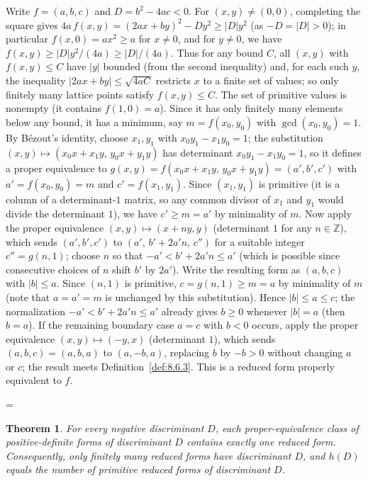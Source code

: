 \documentclass[11pt]{article}
\makeatletter
\theoremstyle{ntstyle}
\newtheorem{theorem}{Theorem}[subsection]
\let\nt@closedisplay\]
\def\nt@guardedclose{\@ifnextchar\par{\nt@closeafterpar}{\@ifnextchar\end{\postdisplaypenalty\@M\nt@closedisplay}{\nt@closedisplay}}}
\def\nt@closeafterpar\par{\@ifnextchar\par{\nt@closeafterpar}{\@ifnextchar\end{\postdisplaypenalty\@M\nt@closedisplay\par}{\nt@closedisplay\par}}}
\renewenvironment{proof}[1][\proofname]{\par
  \pushQED{\qed}\normalfont\topsep\medskipamount\edef\nt@afterproof{\@endparpenalty=\the\@endparpenalty\relax}\@beginparpenalty\@M\@endparpenalty\@M\let\]\nt@guardedclose\trivlist\item[]\textit{#1\@addpunct{.}} \ignorespaces}{\ifvmode\addpenalty\@M\fi\popQED\nt@afterproof\endtrivlist\@endpefalse}
\makeatother
\begin{document}
\begin{proof} Write $f=(a,b,c)$ and $D=b^2-4ac<0$. For
	$(x,y)\neq(0,0)$, completing the square gives
	$4a\,f(x,y)=(2ax+by)^2-Dy^2\ge|D|y^2$ (as $-D=|D|>0$); in particular
	$f(x,0)=ax^2\ge a$ for $x\neq0$, and for $y\neq0$,
	we have $f(x,y)\ge|D|y^2/(4a)\ge|D|/(4a)$. Thus for any bound $C$, all
	$(x,y)$ with $f(x,y)\le C$ have $|y|$ bounded (from the second
	inequality) and, for each such $y$, the inequality $|2ax+by|\le\sqrt{4aC}$ restricts
	$x$ to a finite set of values; so only finitely many lattice points
	satisfy $f(x,y)\le C$. The set of primitive values is nonempty (it contains $f(1,0)=a$). Since it has only finitely many elements below any bound, it has a minimum, say $m=f(x_0,y_0)$ with
	$\gcd(x_0, y_0)=1$. By B{\'e}zout's identity, choose $x_1,y_1$ with $x_0y_1-x_1y_0=1$;
	the substitution $(x,y)\mapsto(x_0x+x_1y,\,y_0x+y_1y)$ has
	determinant $x_0y_1-x_1y_0=1$, so it defines a proper equivalence to
	$g(x,y)=f(x_0x+x_1y,\,y_0x+y_1y)=(a',b',c')$ with $a'=f(x_0,y_0)=m$
	and $c'=f(x_1,y_1)$. Since $(x_1,y_1)$ is primitive (it is a column of a
	determinant-$1$ matrix, so any common divisor of $x_1$ and $y_1$ would
	divide the determinant $1$), we have $c'\ge m=a'$ by minimality of $m$. Now apply the
	proper equivalence $(x,y)\mapsto(x+ny,y)$ (determinant $1$ for any
	$n\in\mathbb{Z}$), which sends $(a',b',c')$ to $(a',\,b'+2a'n,\,c'')$
	for a suitable integer $c''=g(n,1)$; choose $n$ so that
	$-a'<b'+2a'n\le a'$ (which is possible since consecutive choices of $n$ shift
	$b'$ by $2a'$). Write the resulting form as $(a,b,c)$ with $|b|\le
		a$. Since $(n,1)$ is primitive, $c=g(n,1)\ge m=a$ by minimality of
	$m$ (note that $a=a'=m$ is unchanged by this substitution). Hence $|b|\le
		a\le c$; the normalization $-a'<b'+2a'n\le a'$ already gives $b\ge0$ whenever $|b|=a$ (then
	$b=a$). If the remaining boundary case $a=c$ with $b<0$ occurs, apply the proper equivalence
	$(x,y)\mapsto(-y,x)$ (determinant $1$), which sends $(a,b,c)=(a,b,a)$ to $(a,-b,a)$, replacing
	$b$ by $-b>0$ without changing $a$ or $c$; the result meets Definition~\ref{def:8.6.3}. This is a reduced
	form properly equivalent to $f$.

\end{proof}
\begin{theorem}\label{thm:8.6.3}
	For every negative discriminant $D$, each proper-equivalence class of positive-definite forms of discriminant $D$ contains exactly one reduced form. Consequently, only finitely many reduced forms have discriminant $D$, and $h(D)$ equals the number of primitive reduced forms of discriminant $D$.

\end{theorem}
\end{document}
